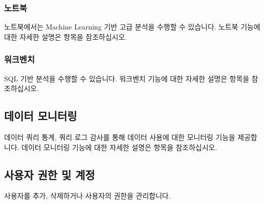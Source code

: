 \documentclass[letterpaper,10pt,english]{sphinxmanual}
\begin{document}
\subsubsection{노트북}
\label{\detokenize{discovery/part01/structure:id6}}
노트북에서는 Machine Learning 기반 고급 분석을 수행할 수 있습니다. 노트북 기능에 대한 자세한 설명은 {\hyperref[\detokenize{discovery/part05/index::doc}]{}} 항목을 참조하십시오.
\begin{quote}

\begin{figure}[H]
\centering

\noindent{}
\end{figure}
\end{quote}


\subsubsection{워크벤치}
\label{\detokenize{discovery/part01/structure:id7}}
SQL 기반 분석을 수행할 수 있습니다. 워크벤치 기능에 대한 자세한 설명은 {\hyperref[\detokenize{discovery/part06/index::doc}]{}} 항목을 참조하십시오.
\begin{quote}

\begin{figure}[H]
\centering

\noindent{}
\end{figure}
\end{quote}


\subsection{데이터 모니터링}
\label{\detokenize{discovery/part01/structure:id8}}
데이터 쿼리 통계, 쿼리 로그 감사를 통해 데이터 사용에 대한 모니터링 기능을 제공합니다. 데이터 모니터링 기능에 대한 자세한 설명은 {\hyperref[\detokenize{discovery/part02/data_monitoring::doc}]{}} 항목을 참조하십시오.
\begin{quote}

\begin{figure}[H]
\centering

\noindent{}
\end{figure}
\end{quote}


\subsection{사용자 권한 및 계정}
\label{\detokenize{discovery/part01/structure:id9}}
사용자를 추가, 삭제하거나 사용자의 권한을 관리합니다.
\end{document}
